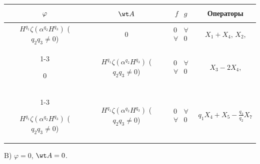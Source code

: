 \begin{center} 


\begin{tabular}{|c|c|c|c|} 


\hline 


$\myrule\varphi$ & $\wt A$ & $\begin{matrix}f & g\end{matrix}$ & Операторы \\ 


\hline 


$H^{q_1}\zeta(\alpha^{q_2}H^{q_3})$ ($q_2q_3\ne0$) & 0 &


$\begin{matrix} 0 & \forall \\ \forall & 0\end{matrix}$ &


$X_1+X_4$, $X_2$, \\


\cline{1-3}


0 & $H^{q_1}\zeta(\alpha^{q_2}H^{q_3})$ ($q_2q_3\ne0$) &


$\begin{matrix} 0 & \forall \\ \forall & 0\end{matrix}$ &


$X_3-2X_4$,\\


\cline{1-3}


$H^{q_1}\zeta(\alpha^{q_2}H^{q_3})$ ($q_2q_3\ne0$) &


$H^{q_1}\zeta(\alpha^{q_2}H^{q_3})$ ($q_2q_3\ne0$) &


$\begin{matrix} 0 & \forall \\ \forall & 0\end{matrix}$ &


$q_1X_4+X_5-\frac{q_3}{q_2}X_7$ \\


\hline


\end{tabular} 


\end{center} 


\smallskip





B) $\varphi=0$, $\wt A=0$.


\smallskip





